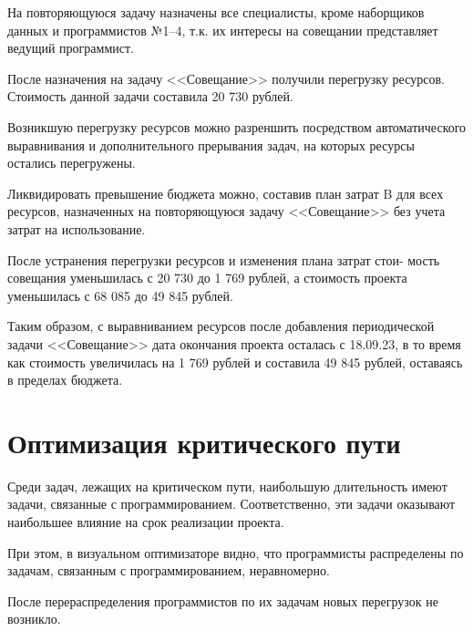 На повторяющуюся задачу назначены все специалисты, кроме наборщиков данных и программистов №1--4, т.к. их интересы на совещании представляет ведущий программист.


После назначения на задачу <<Совещание>> получили перегрузку ресурсов. Стоимость данной задачи составила 20 730 рублей.

Возникшую перегрузку ресурсов можно разреншить посредством автоматического выравнивания и дополнительного прерывания задач, на которых ресурсы остались перегружены. 

Ликвидировать превышение бюджета можно, составив план затрат B для всех ресурсов, назначенных на повторяющуюся задачу <<Совещание>> без учета затрат на использование.



После устранения перегрузки ресурсов и изменения плана затрат стои- мость совещания уменьшилась с 20 730 до 1 769 рублей, а стоимость проекта уменьшилась с 68 085 до 49 845 рублей.

Таким образом, с выравниванием ресурсов после добавления периодической задачи <<Совещание>> дата окончания проекта осталась с 18.09.23, в то время как стоимость увеличилась на 1 769 рублей и составила 49 845 рублей, оставаясь в пределах бюджета.

\section{Оптимизация критического пути}

Среди задач, лежащих на критическом пути, наибольшую длительность имеют задачи, связанные с программированием. Соответственно, эти задачи оказывают наибольшее влияние на срок реализации проекта.

При этом, в визуальном оптимизаторе видно, что программисты распределены по задачам, связанным с программированием, неравномерно.


После перераспределения программистов по их задачам новых перегрузок не возникло.


